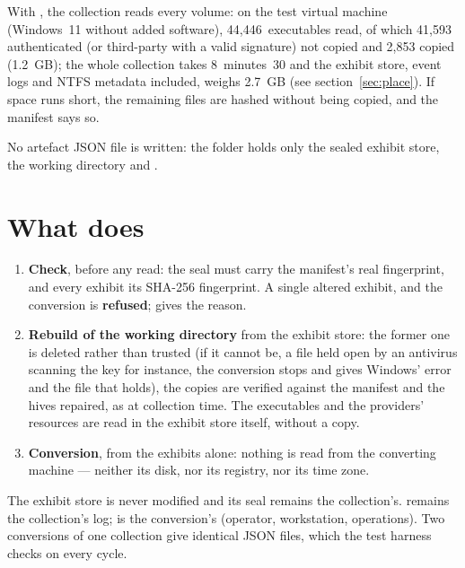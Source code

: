 \documentclass[11pt,a4paper,oneside]{report}
\begin{document}
\begin{attention}
With , the collection reads every volume: on the test virtual
machine (Windows~11 without added software), 44,446~executables read, of which
41,593 authenticated (or third-party with a valid signature) not copied and
2,853 copied (1.2~GB); the whole collection takes 8~minutes~30 and the
exhibit store, event logs and NTFS metadata included, weighs 2.7~GB (see
section~\ref{sec:place}). If space runs short, the remaining files are hashed without being
copied, and the manifest says so.
\end{attention}

No artefact JSON file is written: the folder holds only the sealed exhibit
store, the working directory and .

\section{What  does}

\begin{enumerate}
  \item \textbf{Check}, before any read: the seal must carry the manifest's
        real fingerprint, and every exhibit its SHA-256 fingerprint. A single
        altered exhibit, and the conversion is \textbf{refused};
         gives the reason.
  \item \textbf{Rebuild of the working directory} from the exhibit store: the
        former one is deleted rather than trusted (if it cannot be, a file held
        open by an antivirus scanning the key for instance, the conversion stops
        and gives Windows' error and the file that holds), the copies are verified
        against the manifest and the hives repaired, as at collection time. The
        executables and the providers' resources are read in the exhibit store
        itself, without a copy.
  \item \textbf{Conversion}, from the exhibits alone: nothing is read from the
        converting machine — neither its disk, nor its registry, nor its time
        zone.
\end{enumerate}

The exhibit store is never modified and its seal remains the collection's.
 remains the collection's log;
 is the conversion's (operator, workstation,
operations). Two conversions of one collection give identical JSON files,
which the test harness checks on every cycle.
\end{document}
